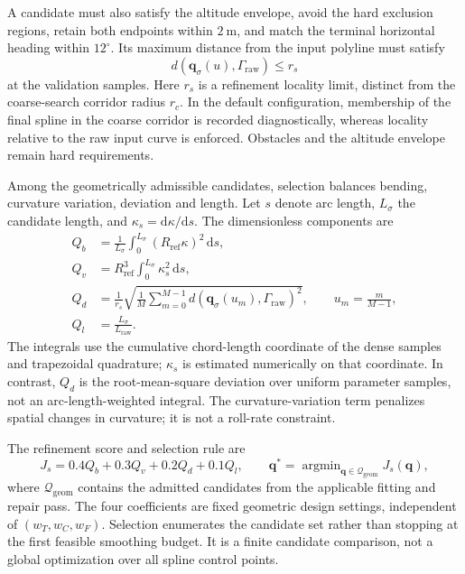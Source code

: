 A candidate must also satisfy the altitude envelope, avoid the hard
exclusion regions, retain both endpoints within $2~\mathrm{m}$, and match
the terminal horizontal heading within $12^\circ$. Its maximum distance
from the input polyline must satisfy
\begin{equation}
 d(\mathbf q_\sigma(u),\Gamma_{\mathrm{raw}})\le r_s
 \label{me:eq:locality}
\end{equation}
at the validation samples. Here $r_s$ is a refinement locality limit,
distinct from the coarse-search corridor radius $r_c$. In the default
configuration, membership of the final spline in the coarse corridor is
recorded diagnostically, whereas locality relative to the raw input curve
is enforced. Obstacles and the altitude envelope remain hard requirements.

Among the geometrically admissible candidates, selection balances bending,
curvature variation, deviation and length. Let $s$ denote arc length,
$L_\sigma$ the candidate length, and $\kappa_s=\mathrm d\kappa/\mathrm ds$.
The dimensionless components are
\begin{align}
 Q_b&=\frac{1}{L_\sigma}
       \int_0^{L_\sigma}(R_{\mathrm{ref}}\kappa)^2\,\mathrm ds,
       \label{me:eq:bending}\\
 Q_v&=R_{\mathrm{ref}}^3
       \int_0^{L_\sigma}\kappa_s^2\,\mathrm ds,
       \label{me:eq:variation}\\
 Q_d&=\frac{1}{r_s}
       \sqrt{\frac{1}{M}\sum_{m=0}^{M-1}
       d(\mathbf q_\sigma(u_m),\Gamma_{\mathrm{raw}})^2},
       \qquad u_m=\frac{m}{M-1},
       \label{me:eq:deviation}\\
 Q_l&=\frac{L_\sigma}{L_{\mathrm{raw}}}.
       \label{me:eq:length}
\end{align}
The integrals use the cumulative chord-length coordinate of the dense
samples and trapezoidal quadrature; $\kappa_s$ is estimated numerically
on that coordinate. In contrast, $Q_d$ is the root-mean-square deviation
over uniform parameter samples, not an arc-length-weighted integral.
The curvature-variation term penalizes spatial changes in curvature;
it is not a roll-rate constraint.

The refinement score and selection rule are
\begin{equation}
 J_s=0.4Q_b+0.3Q_v+0.2Q_d+0.1Q_l,\qquad
 \mathbf q^*=\mathop{\arg\min}_{\mathbf q\in\mathcal Q_{\mathrm{geom}}}
 J_s(\mathbf q),
 \label{me:eq:selection}
\end{equation}
where $\mathcal Q_{\mathrm{geom}}$ contains the admitted candidates from
the applicable fitting and repair pass. The four coefficients are fixed
geometric design settings, independent of $(w_T,w_C,w_F)$. Selection
enumerates the candidate set rather than stopping at the first feasible
smoothing budget. It is a finite candidate comparison, not a global
optimization over all spline control points.

